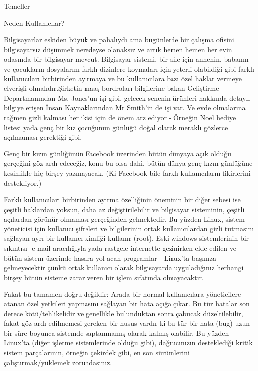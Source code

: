 \begin{section}{Temeller}
\begin{subsection}{Neden Kullanıcılar?}

Bilgisayarlar eskiden büyük ve pahalıydı ama bugünlerde bir çalışma ofisini bilgisayarsız düşünmek neredeyse olanaksız ve artık hemen hemen her evin odasında bir bilgisayar mevcut. Bilgisayar sistemi, bir aile için annenin, babanın ve çocukların dosyalarını farklı dizinlere koymaları için yeterli olabildiği gibi farklı kullanıcıları birbirinden ayırmaya ve bu kullanıcılara bazı özel haklar vermeye elverişli olmalıdır.Şirketin maaş bordroları bilgilerine bakan Geliştirme Departmanından Ms. Jones'un işi gibi, gelecek senenin ürünleri hakkında detaylı bilgiye erişen İnsan Kaynaklarından Mr Smith'in de işi var. Ve evde olmalarına rağmen gizli kalması her ikisi için de önem arz ediyor - Örneğin Noel hediye listesi yada genç bir kız çocuğunun günlüğü doğal olarak meraklı gözlerce açılmaması gerektiği gibi.

Genç bir kızın günliğünün Facebook üzerinden bütün dünyaya açık olduğu gerçeğini göz ardı edeceğiz, konu bu olsa dahi, bütün dünya genç kızın günlüğüne kesinlikle hiç birşey yazmayacak. (Ki Facebook bile farklı kullanıcıların fikirlerini destekliyor.)

Farklı kullanıcıları birbirinden ayırma özelliğinin öneminin bir diğer sebesi ise çeşitli haklardan yoksun, daha az değiştirilebilir ve bilgisayar sisteminin, çeşitli açılardan görünür olmaması gerçeğinden gelmektedir. Bu yüzden Linux, sistem yöneticisi için kullanıcı şifreleri ve bilgilerinin ortak kullanıcılardan gizli tutmasını sağlayan ayrı bir kullanıcı kimliği kullanır (root). Eski windows sistemlerinin bir sıkıntısı- e-mail aracılığıyla yada rastgele internette gezinirken elde edilen ve bütün sistem üzerinde hasara yol acan programlar - Linux'ta başınıza gelmeyecektir çünkü ortak kullanıcı olarak bilgisayarda uyguladığınız herhangi birşey bütün sisteme zarar veren bir işlem sıfatında olmayacaktır.

Fakat bu tamamen doğru değildir: Arada bir normal kullanıcılara yöneticilere atanan özel yetkileri yapmasını sağlayan bir hata açığa çıkar. Bu tür hatalar son derece kötü/tehlikelidir ve genellikle bulunduktan sonra çabucak düzeltilebilir, fakat göz ardı edilmemesi gereken bir husus vardır ki bu tür bir hata (bug) uzun bir süre boyunca sistemde saptanmamış olarak kalmış olabilir. Bu yüzden Linux’ta (diğer işletme sistemlerinde olduğu gibi), dağıtıcınızın desteklediği kritik sistem parçalarının, örneğin çekirdek gibi, en son sürümlerini çalıştırmak/yüklemek zorundasınız.


\end{subsection}
\end{section}
